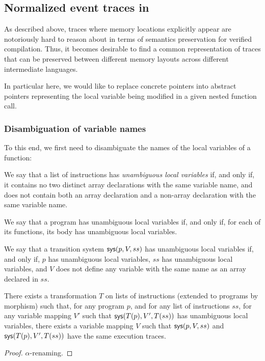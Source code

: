 \subsection{Normalized event traces in \cstar} \label{sec:norm-traces}

As described above, traces where memory locations explicitly appear
are notoriously hard to reason about in terms of semantics
preservation for verified compilation. Thus, it becomes desirable to
find a common representation of traces that can be preserved between
different memory layouts across different intermediate languages.

In particular here, we would like to replace concrete pointers into
abstract pointers representing the local variable being modified in a
given nested function call.

\subsubsection{Disambiguation of variable names} \label{sec:unambiguous-variables}

To this end, we first need to disambiguate the names of the local
variables of a \cstar function:

\begin{definition}
  We say that a list of \cstar instructions has \emph{unambiguous local
    variables} if, and only if, it contains no two distinct array
  declarations with the same variable name, and does not contain both
  an array declaration and a non-array declaration with the same
  variable name.
  
  We say that a \cstar program has unambiguous local variables if, and
  only if, for each of its functions, its body has unambiguous local
  variables.

  We say that a \cstar transition system $\text{\textsf{sys}}(p, V, ss)$ has unambiguous
  local variables if, and only if, $p$ has unambiguous local
  variables, $ss$ has unambiguous local variables, and $V$ does not
  define any variable with the same name as an array declared in $ss$.
\end{definition}

\begin{lemma}
  There exists a transformation $T$ on lists of instructions (extended
  to programs by morphism) such that, for any \cstar program $p$, and for
  any list of \cstar instructions $ss$, %
  for any variable mapping $V'$ %
  such that $\text{\textsf{sys}}(T(p),V',T(ss))$ has unambiguous local variables,
  there exists a variable mapping $V$ %
  such that $\text{\textsf{sys}}(p,V,ss)$ and $\text{\textsf{sys}}(T(p),V',T(ss))$ have the same
  execution traces.
\end{lemma}
\begin{proof} $\alpha$-renaming. \end{proof}

